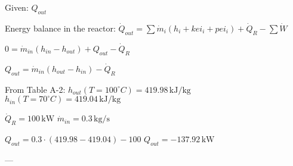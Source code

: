 Given: \( Q_{out} \)  

Energy balance in the reactor:  
\( \dot{Q}_{out} = \sum \dot{m}_i (h_i + kei_i + pei_i) + \dot{Q}_R - \sum \dot{W} \)  

\( 0 = \dot{m}_{in} (h_{in} - h_{out}) + Q_{out} - \dot{Q}_R \)  

\( Q_{out} = \dot{m}_{in} (h_{out} - h_{in}) - \dot{Q}_R \)  

From Table A-2:  
\( h_{out} (T = 100^\circ C) = 419.98 \, \text{kJ/kg} \)  
\( h_{in} (T = 70^\circ C) = 419.04 \, \text{kJ/kg} \)  

\( \dot{Q}_R = 100 \, \text{kW} \)  
\( \dot{m}_{in} = 0.3 \, \text{kg/s} \)  

\( Q_{out} = 0.3 \cdot (419.98 - 419.04) - 100 \)  
\( Q_{out} = -137.92 \, \text{kW} \)  

---